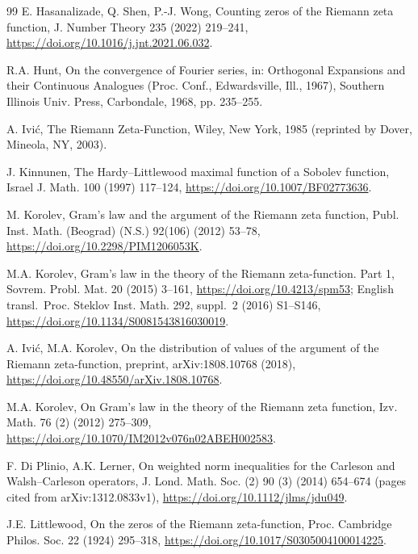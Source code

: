 \documentclass[preprint,12pt]{elsarticle}
\numberwithin{equation}{section}
\theoremstyle{plain}
\theoremstyle{definition}
\theoremstyle{remark}
\begin{document}
\begin{thebibliography}{99}
E. Hasanalizade, Q. Shen, P.-J. Wong, Counting zeros of the Riemann zeta function, J. Number Theory 235 (2022) 219--241, \href{https://doi.org/10.1016/j.jnt.2021.06.032}{https://doi.org/10.1016/j.jnt.2021.06.032}.

R.A. Hunt, On the convergence of Fourier series, in: Orthogonal Expansions and their Continuous Analogues (Proc. Conf., Edwardsville, Ill., 1967), Southern Illinois Univ. Press, Carbondale, 1968, pp. 235--255.

A. Ivi\'c, The Riemann Zeta-Function, Wiley, New York, 1985 (reprinted by Dover, Mineola, NY, 2003).

J. Kinnunen, The Hardy--Littlewood maximal function of a Sobolev function, Israel J. Math. 100 (1997) 117--124, \href{https://doi.org/10.1007/BF02773636}{https://doi.org/10.1007/BF02773636}.

M. Korolev, Gram's law and the argument of the Riemann zeta function, Publ. Inst. Math. (Beograd) (N.S.) 92(106) (2012) 53--78, \href{https://doi.org/10.2298/PIM1206053K}{https://doi.org/10.2298/PIM1206053K}.

M.A. Korolev, Gram\textquoteright s law in the theory of the Riemann zeta-function. Part 1, Sovrem. Probl. Mat. 20 (2015) 3--161, \href{https://doi.org/10.4213/spm53}{https://doi.org/10.4213/spm53}; English transl.\ Proc. Steklov Inst. Math. 292, suppl.~2 (2016) S1--S146, \href{https://doi.org/10.1134/S0081543816030019}{https://doi.org/10.1134/S0081543816030019}.

A. Ivi\'c, M.A. Korolev, On the distribution of values of the argument of the Riemann zeta-function, preprint, arXiv:1808.10768 (2018), \href{https://doi.org/10.48550/arXiv.1808.10768}{https://doi.org/10.48550/arXiv.1808.10768}.

M.A. Korolev, On Gram's law in the theory of the Riemann zeta function, Izv. Math. 76 (2) (2012) 275--309, \href{https://doi.org/10.1070/IM2012v076n02ABEH002583}{https://doi.org/10.1070/IM2012v076n02ABEH002583}.


F. Di Plinio, A.K. Lerner, On weighted norm inequalities for the Carleson and Walsh--Carleson operators, J. Lond. Math. Soc. (2) 90 (3) (2014) 654--674 (pages cited from arXiv:1312.0833v1), \href{https://doi.org/10.1112/jlms/jdu049}{https://doi.org/10.1112/jlms/jdu049}.

J.E. Littlewood, On the zeros of the Riemann zeta-function, Proc. Cambridge Philos. Soc. 22 (1924) 295--318, \href{https://doi.org/10.1017/S0305004100014225}{https://doi.org/10.1017/S0305004100014225}.


\end{thebibliography}
\end{document}

